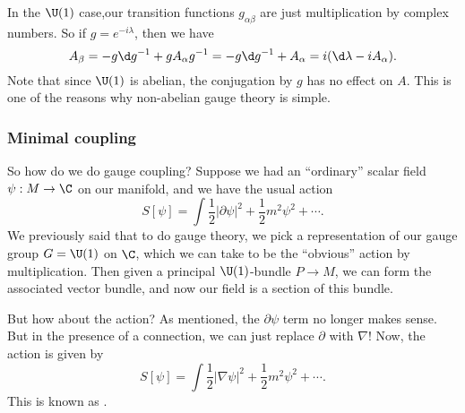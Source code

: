 \documentclass[a4paper]{article}
\begin{document}
\begin{eg}
  In the $\U(1)$ case,our transition functions $g_{\alpha\beta}$ are just multiplication by complex numbers. So if $g = e^{-i\lambda}$, then we have
  \[
    A_{\beta} = -g \d g^{-1} + g A_\alpha g^{-1} = -g \d g^{-1} + A_\alpha = i(\d \lambda - iA_\alpha).
  \]
  Note that since $\U(1)$ is abelian, the conjugation by $g$ has no effect on $A$. This is one of the reasons why non-abelian gauge theory is simple.
\end{eg}

\subsubsection*{Minimal coupling}
So how do we do gauge coupling? Suppose we had an ``ordinary'' scalar field $\psi : M \to \C$ on our manifold, and we have the usual action
\[
  S[\psi] = \int \frac{1}{2} |\partial \psi|^2 + \frac{1}{2} m^2 \psi^2 + \cdots.
\]
We previously said that to do gauge theory, we pick a representation of our gauge group $G = \U(1)$ on $\C$, which we can take to be the ``obvious'' action by multiplication. Then given a principal $\U(1)$-bundle $P \to M$, we can form the associated vector bundle, and now our field is a section of this bundle.

But how about the action? As mentioned, the $\partial \psi$ term no longer makes sense. But in the presence of a connection, we can just replace $\partial$ with $\nabla$! Now, the action is given by
\[
  S[\psi] = \int \frac{1}{2} |\nabla \psi|^2 + \frac{1}{2} m^2 \psi^2 + \cdots.
\]
This is known as .
\end{document}
